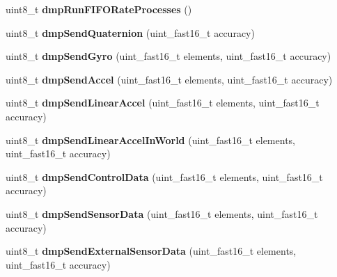 \begin{DoxyCompactItemize}
\mbox{\label{class_m_p_u6050_ab3e86446b6ac00436727db482069a5e5}} 
uint8\+\_\+t {\bfseries dmp\+Run\+F\+I\+F\+O\+Rate\+Processes} ()
\item 
\mbox{\label{class_m_p_u6050_ac0f184549296f18d3f5a84a1a0e14be2}} 
uint8\+\_\+t {\bfseries dmp\+Send\+Quaternion} (uint\+\_\+fast16\+\_\+t accuracy)
\item 
\mbox{\label{class_m_p_u6050_a5bc20cd1bebc38fe074e5c0671e5eeef}} 
uint8\+\_\+t {\bfseries dmp\+Send\+Gyro} (uint\+\_\+fast16\+\_\+t elements, uint\+\_\+fast16\+\_\+t accuracy)
\item 
\mbox{\label{class_m_p_u6050_ab9257a8106b4235be0653dd3d1a0fceb}} 
uint8\+\_\+t {\bfseries dmp\+Send\+Accel} (uint\+\_\+fast16\+\_\+t elements, uint\+\_\+fast16\+\_\+t accuracy)
\item 
\mbox{\label{class_m_p_u6050_a4a82e600909d259280493cd83e0ee771}} 
uint8\+\_\+t {\bfseries dmp\+Send\+Linear\+Accel} (uint\+\_\+fast16\+\_\+t elements, uint\+\_\+fast16\+\_\+t accuracy)
\item 
\mbox{\label{class_m_p_u6050_a05e012b160f512cb48e9c15d6b8abd60}} 
uint8\+\_\+t {\bfseries dmp\+Send\+Linear\+Accel\+In\+World} (uint\+\_\+fast16\+\_\+t elements, uint\+\_\+fast16\+\_\+t accuracy)
\item 
\mbox{\label{class_m_p_u6050_a8e2e01f401333d24d8c6dbcaf069dcac}} 
uint8\+\_\+t {\bfseries dmp\+Send\+Control\+Data} (uint\+\_\+fast16\+\_\+t elements, uint\+\_\+fast16\+\_\+t accuracy)
\item 
\mbox{\label{class_m_p_u6050_a8e34dafaffb307b410cb5411eda30d25}} 
uint8\+\_\+t {\bfseries dmp\+Send\+Sensor\+Data} (uint\+\_\+fast16\+\_\+t elements, uint\+\_\+fast16\+\_\+t accuracy)
\item 
\mbox{\label{class_m_p_u6050_a9ab7129881263e634dee0d3b0ca802c4}} 
uint8\+\_\+t {\bfseries dmp\+Send\+External\+Sensor\+Data} (uint\+\_\+fast16\+\_\+t elements, uint\+\_\+fast16\+\_\+t accuracy)
\item 
\mbox{\label{class_m_p_u6050_ad3ac445505589ef21a798f5441f86c7a}} 

\end{DoxyCompactItemize}
